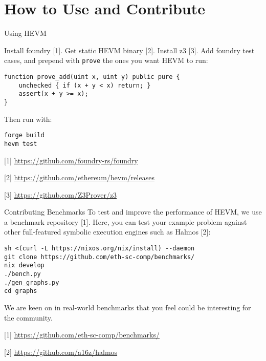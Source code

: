 \documentclass{beamer}
\begin{document}
\section{How to Use and Contribute}
\begin{frame}[fragile=singleslide]{Using HEVM}

Install foundry [1]. Get static HEVM binary [2]. Install z3 [3]. Add foundry test cases, and prepend with \texttt{prove} the ones you want HEVM to run:

\begin{Verbatim}[frame=single, framerule=0.2mm, framesep=2mm,fontsize=\footnotesize]
function prove_add(uint x, uint y) public pure {
    unchecked { if (x + y < x) return; }
    assert(x + y >= x);
}
\end{Verbatim}

Then run with:

\begin{Verbatim}[frame=single, framerule=0.2mm, framesep=2mm,fontsize=\footnotesize]
forge build
hevm test
\end{Verbatim}


\bigskip

[1] \url{https://github.com/foundry-rs/foundry}

[2] \url{https://github.com/ethereum/hevm/releases}

[3] \url{https://github.com/Z3Prover/z3}
\end{frame}


\begin{frame}[fragile=singleslide]{Contributing Benchmarks}
To test and improve the performance of HEVM, we use a benchmark repository [1]. Here, you can test your example problem against other full-featured symbolic execution engines such as Halmos [2]:


\begin{Verbatim}[frame=single, framerule=0.2mm, framesep=2mm,fontsize=\footnotesize]
sh <(curl -L https://nixos.org/nix/install) --daemon
git clone https://github.com/eth-sc-comp/benchmarks/
nix develop
./bench.py
./gen_graphs.py
cd graphs
\end{Verbatim}

We are keen on in real-world benchmarks that you feel could be interesting for the community.

\bigskip

[1] \url{https://github.com/eth-sc-comp/benchmarks/}

[2] \url{https://github.com/a16z/halmos}
\end{frame}
\end{document}
